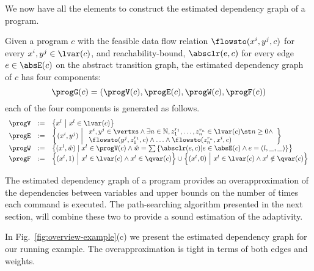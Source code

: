 We now have all the elements to construct the estimated dependency graph of a program.
\begin{defn}
\label{def:prog_graph}
Given a program $c$ 
with the feasible data flow relation $\flowsto(x^i, y^j, c)$ for every $x^i, y^j \in \lvar(c)$, 
and reachability-bound, $\absclr(e, c)$ for every edge $e \in \absE(c)$ on the abstract transition graph,
the estimated dependency graph of $c$ has four components:
\[\progG(c) = (\progV(c), \progE(c), \progW(c), \progF(c))\]
each of the four components is generated as follows.
{\small
\[
\begin{array}{lll}
\progV & := & \left\{ 
x^l
~ \middle\vert ~
x^l \in \lvar(c)
\right\}
\\
\progE & := & 
\left\{ 
(x^i, y^j) 
~ \middle\vert ~
\begin{array}{l}
x^i, y^j \in \vertxs
\land
\exists n \in \mathbb{N}, z_1^{r_1}, \ldots, z_n^{r_n} \in \lvar(c) \st
n \geq 0 \land
\\
\flowsto(y^j, z_1^{r_1}, c) 
\land \ldots \land \flowsto(z_n^{r_n}, x^i, c) 
\end{array}
\right\}
\\
\progW & := &
\left\{ (x^l, \hat{w}) 
\mid
x^l \in \progV(c) 
\land 
\hat{w} = 
\sum\left\{ \absclr(e, c) \middle\vert e \in \absE(c) \land e = (l, \_, \_) \right\}
\right\}
\\
\progF & := & 
\Big\{(x^l, 1) 
~ \Big\vert ~
 x^l \in \lvar(c) \land
 x^l \in \qvar(c)\Big \}
 \cup
 \Big\{(x^l, 0) 
~ \Big \vert ~
 x^l \in \lvar(c) \land
 x^l \notin \qvar(c)\Big\}
\end{array}
\] }
\end{defn}
The estimated dependency graph of a program provides an overapproximation of the dependencies between variables and upper bounds on the number of times each command is executed. The path-searching algorithm presented in the next section, will combine these two to provide a sound estimation of the adaptivity.

In Fig.~\ref{fig:overview-example}(c) we present  the estimated dependency graph for our 
running example. The overapproximation is tight in terms of both edges and weights.

